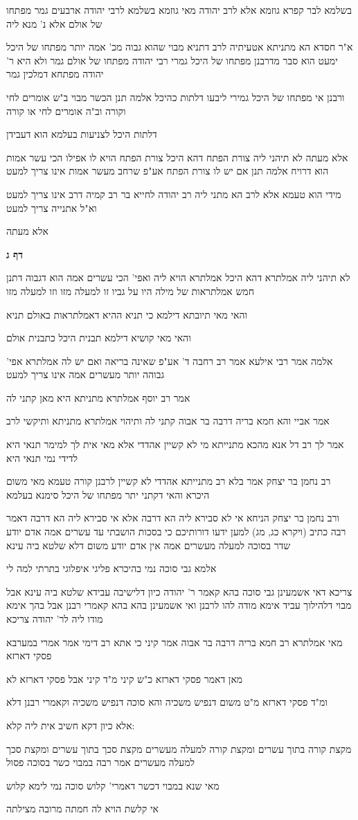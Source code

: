 \documentclass[12pt, openany]{book}
\newcommand{\sethebfont}{
\fontsize{10.5pt}{21.0pt} \selectfont
}
\newcommand{\textblock}[1]{
{\sethebfont #1\\}	
}
\newcommand{\sectname}{}
\newcommand{\newsection}[1]{
	\addcontentsline{toc}{section}{#1}
	\renewcommand{\sectname}{#1}	
	\vspace{-\baselineskip}
	\begin{center}
		\textbf{%
\fontsize{16pt}{16pt}\selectfont
			#1}
	\end{center}
	\vspace{-\baselineskip}
	\nopagebreak
}
\begin{document}
\textblock{בשלמא לבר קפרא גוזמא אלא לרב יהודה מאי גוזמא בשלמא לרבי יהודה ארבעים גמר מפתחו של אולם אלא נ' מנא ליה}
\textblock{א"ר חסדא הא מתניתא אטעיתיה לרב דתניא מבוי שהוא גבוה מכ' אמה יותר מפתחו של היכל ימעט הוא סבר מדרבנן מפתחו של היכל גמרי רבי יהודה מפתחו של אולם גמר ולא היא ר' יהודה מפתחא דמלכין גמר}
\textblock{ורבנן אי מפתחו של היכל גמירי ליבעו דלתות כהיכל אלמה תנן הכשר מבוי ב"ש אומרים לחי וקורה וב"ה אומרים לחי או קורה}
\textblock{דלתות היכל לצניעות בעלמא הוא דעבידן}
\textblock{אלא מעתה לא תיהני ליה צורת הפתח דהא היכל צורת הפתח הויא לו אפילו הכי עשר אמות הוא דרויח אלמה תנן אם יש לו צורת הפתח אע"פ שרחב מעשר אמות אינו צריך למעט}
\textblock{מידי הוא טעמא אלא לרב הא מתני ליה רב יהודה לחייא בר רב קמיה דרב אינו צריך למעט וא"ל אתנייה צריך למעט}
\textblock{אלא מעתה}
\newsection{דף ג}
\textblock{לא תיהני ליה אמלתרא דהא היכל אמלתרא הויא ליה ואפי' הכי עשרים אמה הוא דגבוה דתנן חמש אמלתראות של מילה היו על גביו זו למעלה מזו וזו למעלה מזו}
\textblock{והאי מאי תיובתא דילמא כי תניא ההיא דאמלתראות באולם תניא}
\textblock{והאי מאי קושיא דילמא תבנית היכל כתבנית אולם}
\textblock{אלמה אמר רבי אילעא אמר רב רחבה ד' אע"פ שאינה בריאה ואם יש לה אמלתרא אפי' גבוהה יותר מעשרים אמה אינו צריך למעט}
\textblock{אמר רב יוסף אמלתרא מתניתא היא מאן קתני לה}
\textblock{אמר אביי והא חמא בריה דרבה בר אבוה קתני לה ותיהוי אמלתרא מתניתא ותיקשי לרב}
\textblock{אמר לך רב דל אנא מהכא מתנייתא מי לא קשיין אהדדי אלא מאי אית לך למימר תנאי היא לדידי נמי תנאי היא}
\textblock{רב נחמן בר יצחק אמר בלא רב מתנייתא אהדדי לא קשיין לרבנן קורה טעמא מאי משום היכרא והאי דקתני יתר מפתחו של היכל סימנא בעלמא}
\textblock{ורב נחמן בר יצחק הניחא אי לא סבירא ליה הא דרבה אלא אי סבירא ליה הא דרבה דאמר רבה כתיב (ויקרא כג, מג) למען ידעו דורותיכם כי בסכות הושבתי עד עשרים אמה אדם יודע שדר בסוכה למעלה מעשרים אמה אין אדם יודע משום דלא שלטא ביה עינא}
\textblock{אלמא גבי סוכה נמי בהיכרא פליגי איפלוגי בתרתי למה לי}
\textblock{צריכא דאי אשמעינן גבי סוכה בהא קאמר ר' יהודה כיון דלישיבה עבידא שלטא ביה עינא אבל מבוי דלהילוך עביד אימא מודה להו לרבנן ואי אשמעינן בהא בהא קאמרי רבנן אבל בהך אימא מודו ליה לר' יהודה צריכא}
\textblock{מאי אמלתרא רב חמא בריה דרבה בר אבוה אמר קיני כי אתא רב דימי אמר אמרי במערבא פסקי דארזא}
\textblock{מאן דאמר פסקי דארזא כ"ש קיני מ"ד קיני אבל פסקי דארזא לא}
\textblock{ומ"ד פסקי דארזא מ"ט משום דנפיש משכיה והא סוכה דנפיש משכיה וקאמרי רבנן דלא}
\textblock{אלא כיון דקא חשיב אית ליה קלא:}
\textblock{מקצת קורה בתוך עשרים ומקצת קורה למעלה מעשרים מקצת סכך בתוך עשרים ומקצת סכך למעלה מעשרים אמר רבה במבוי כשר בסוכה פסול}
\textblock{מאי שנא במבוי דכשר דאמרי' קלוש סוכה נמי לימא קלוש}
\textblock{אי קלשת הויא לה חמתה מרובה מצילתה}
\end{document}
